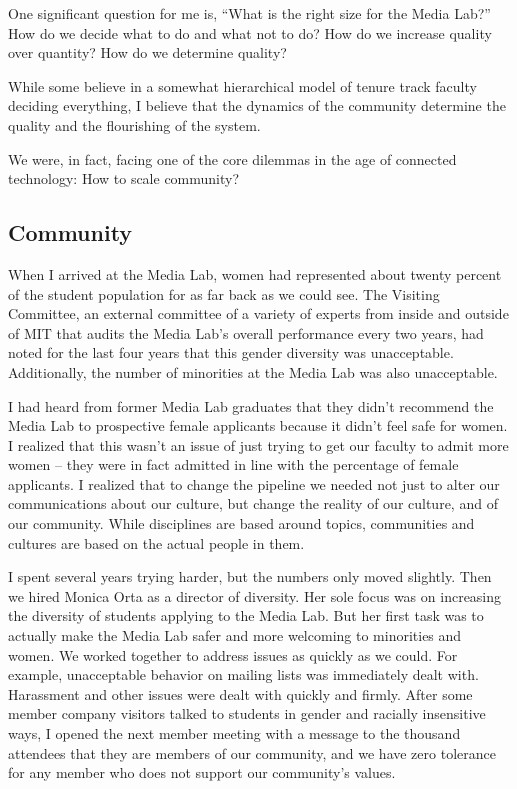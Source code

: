 One significant question for me is, ``What is the right size for the Media Lab?'' How do we decide what to do and what not to do? How do we increase quality over quantity? How do we determine quality?

While some believe in a somewhat hierarchical model of tenure track faculty deciding everything, I believe that the dynamics of the community determine the quality and the flourishing of the system.

We were, in fact, facing one of the core dilemmas in the age of connected technology: How to scale community?

\subsection{Community}

When I arrived at the Media Lab, women had represented about twenty percent of the student population for as far back as we could see. The Visiting Committee, an external committee of a variety of experts from inside and outside of MIT that audits the Media Lab's overall performance every two years, had noted for the last four years that this gender diversity was unacceptable. Additionally, the number of minorities at the Media Lab was also unacceptable.

I had heard from former Media Lab graduates that they didn't recommend the Media Lab to prospective female applicants because it didn't feel safe for women. I realized that this wasn't an issue of just trying to get our faculty to admit more women -- they were in fact admitted in line with the percentage of female applicants. I realized that  to change the pipeline we needed not just to alter our communications about our culture, but change the reality of our culture, and of our community. While disciplines are based around topics, communities and cultures are based on the actual people in them.

I spent several years trying harder, but the numbers only moved slightly. Then we hired Monica Orta as a director of diversity. Her sole focus was on increasing the diversity of students applying to the Media Lab. But her first task was to actually make the Media Lab safer and more welcoming to minorities and women. We worked together to address issues as quickly as we could. For example, unacceptable behavior on mailing lists was immediately dealt with. Harassment and other issues were dealt with quickly and firmly. After some member company visitors talked to students in gender and racially insensitive ways, I opened the next member meeting with a message to the thousand attendees that they are members of our community, and we have zero tolerance for any member who does not support our community's values.

